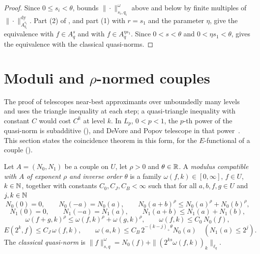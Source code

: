 \begin{proof}
\leanok
Since $0 \leq s_i < \theta$,  bounds
$\|\cdot\|^{\omega}_{s_i, q_i}$ above and below by finite multiples of
$\|\cdot\|^{\mathrm{dy}}_{A^{s_i}_{q_i}}$. Part (2) of ,
and part (1) with $r = s_1$ and the parameter $\eta$, give the equivalence with $f \in A^s_q$
and with $f \in A^{\eta s_1}_q$. Since $0 < s < \theta$ and $0 < \eta s_1 < \theta$,
 gives the equivalence with the classical quasi-norms.
\end{proof}

\section{Moduli and \texorpdfstring{$\rho$}{rho}-normed couples}
\label{sec:moduli-quasi}

The proof of  telescopes near-best approximants over unboundedly
many levels and uses the triangle inequality at each step; a quasi-triangle inequality with
constant $C$ would cost $C^k$ at level $k$. In $L_p$, $0 < p < 1$, the $p$-th power of the
quasi-norm is subadditive (), and DeVore and Popov telescope in that
power~\cite[(2.3)]{DeVorePopovTAMS}. This section states the coincidence theorem in this form,
for the $E$-functional of a couple ().

\begin{definition}
\label{def:couple-modulus-data}
\leanok
{}
Let $A = (N_0, N_1)$ be a couple on $U$, let $\rho > 0$ and $\theta \in \mathbb{R}$. A \emph{modulus
compatible with $A$ of exponent $\rho$ and inverse order $\theta$} is a family
$\omega(f, k) \in [0, \infty]$, $f \in U$, $k \in \mathbb{N}$, together with constants
$C_0, C_J, C_B < \infty$ such that for all $a, b, f, g \in U$ and $j, k \in \mathbb{N}$
\[
  N_0(0) = 0, \qquad N_0(-a) = N_0(a), \qquad N_0(a + b)^\rho \leq N_0(a)^\rho + N_0(b)^\rho,
\]
\[
  N_1(0) = 0, \qquad N_1(-a) = N_1(a), \qquad N_1(a + b) \leq N_1(a) + N_1(b),
\]
\[
  \omega(f + g, k)^\rho \leq \omega(f, k)^\rho + \omega(g, k)^\rho, \qquad
  \omega(f, k) \leq C_0 \, N_0(f),
\]
\[
  E(2^k, f) \leq C_J \, \omega(f, k), \qquad
  \omega(a, k) \leq C_B \, 2^{-(k - j)_+ \theta} N_0(a) \quad (N_1(a) \leq 2^j) .
\]
The \emph{classical quasi-norm} is
$\|f\|^{\omega}_{s,q} = N_0(f) + \|(2^{ks} \omega(f, k))_k\|_{\ell_q}$.
\end{definition}

